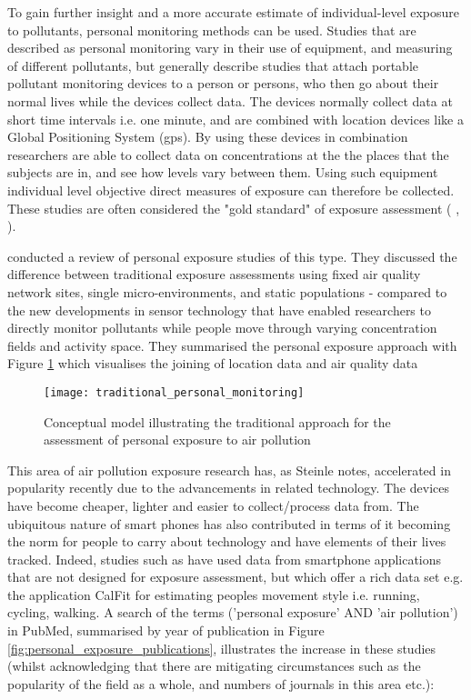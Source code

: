 To gain further insight and a more accurate estimate of individual-level exposure to pollutants, personal monitoring methods can be used. Studies that are described as personal monitoring vary in their use of equipment, and measuring of different pollutants, but generally describe studies that attach portable pollutant monitoring devices to a person or persons, who then go about their normal lives while the devices collect data. The devices normally collect data at short time intervals i.e. one minute, and are combined with location devices like a Global Positioning System (\gls{gps}). By using these devices in combination researchers are able to collect data on concentrations at the the places that the subjects are in, and see how levels vary between them. Using such equipment individual level objective direct measures of exposure can therefore be collected. These studies are often considered the "gold standard" of exposure assessment (\cite{Ashworth2013} , \cite{DeNazelle2008}).

\cite{Steinle2013} conducted a review of personal exposure studies of this type. They discussed the difference between traditional exposure assessments using fixed air quality network sites, single micro-environments, and static populations - compared to the new developments in sensor technology that have enabled researchers to directly monitor pollutants while people move through varying concentration fields and activity space. They summarised the personal exposure approach with Figure \ref{fig:traditional_personal_monitoring} which visualises the joining of location data and air quality data

\begin{figure}[H]
\centering
\texttt{[image: traditional\_personal\_monitoring]}
\caption{Conceptual model illustrating the traditional approach for the assessment of personal exposure to air pollution}
\label{fig:traditional_personal_monitoring}
\end{figure}

This area of air pollution exposure research has, as Steinle notes, accelerated in popularity recently due to the advancements in related technology. The devices have become cheaper, lighter and easier to collect/process data from. The ubiquitous nature of smart phones has also contributed in terms of it becoming the norm for people to carry about technology and have elements of their lives tracked. Indeed, studies such as \cite{DeNazelle2013} have used data from smartphone applications that are not designed for exposure assessment, but which offer a rich data set e.g. the application CalFit for estimating peoples movement style i.e. running, cycling, walking. A search of the terms ('personal exposure' AND 'air pollution') in PubMed, summarised by year of publication in Figure \ref{fig:personal_exposure_publications},  illustrates the increase in these studies (whilst acknowledging that there are mitigating circumstances such as the popularity of the field as a whole, and numbers of journals in this area etc.):

